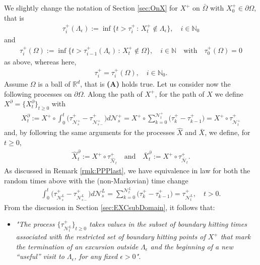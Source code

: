 \documentclass[11pt,a4paper]{article}
\begin{document}
{We slightly change the notation of Section \ref{sec:OnX} for $X^+$ on $\bar{\Omega}$ with $X^+_0 \in \partial \Omega$, that is
\begin{align*}
\tau_i^+(\Lambda_\epsilon) := \inf\{t > \tau_{i}^+\, :\, X^+_t \notin  \Lambda_\epsilon \}, \quad i \in \mathbb{N}_0
\end{align*} 
and 
\begin{align*}
\tau^+_i (\Omega) := \inf\{t > \tau_{i-1}^+(\Lambda_\epsilon)\, :\, X^+_t \notin  \Omega \}, \quad i \in \mathbb{N} \quad \textrm{with} \quad \tau^+_0(\Omega)=0
\end{align*}
as above, whereas here,
\begin{align*}
\tau^+_i= \tau^+_i(\Omega), \quad i \in \mathbb{N}_0.
\end{align*}
Assume $\Omega$ is a ball of $\mathbb{R}^d$, that is {\bf (A)} holds true. Let us consider now the following processes on $\partial \Omega$. Along the path of $X^+$, for the path of $X$ we define $X^\partial = \{X^\partial_t\}_{t\geq 0}$ with   
\begin{align*}
X^\partial_t := X^+ \circ \int_0^t \big( \tau^+_{\mathcal{N}^+_s} - \tau^+_{\mathcal{N}^+_{s-}} \big) d\mathcal{N}^+_s = X^+ \circ \sum_{k=0}^{\mathcal{N}^+_t} \big( \tau^+_k - \tau^+_{k-1} \big) = X^+ \circ \tau^+_{\mathcal{N}^+_t}
\end{align*}
and, by following the same arguments for the processes $\hat{X}$ and $\bar{X}$, we define, for $t\geq 0$,
\begin{align*}
\hat{X}^\partial_t := X^+ \circ \tau^+_{\hat{\mathcal{N}}_t} \quad \textrm{and} \quad \bar{X}^\partial_t := X^+ \circ \tau^+_{\bar{\mathcal{N}}_t}.
\end{align*}
As discussed in Remark \ref{rmk:PPPlast}, we have equivalence in law for both the random times above with the (non-Markovian) time change
\begin{align*}
\int_0^t \big( \tau^+_{\mathcal{N}^L_s} - \tau^+_{\mathcal{N}^L_{s-}} \big) d\mathcal{N}^L_s = \sum_{k=0}^{\mathcal{N}^L_t} \big( \tau^+_k - \tau^+_{k-1} \big) = \tau^+_{\mathcal{N}^L_t}, \quad t >0.
\end{align*}
From the discussion in Section \ref{sec:EXCsubDomain}, it follows that:
\begin{itemize}
\item[] \begin{minipage}{0.85\textwidth}
{\it "The process $\{\tau^+_{\mathcal{N}^L_t}\}_{t\geq 0}$ takes values in the subset of boundary hitting times associated with the restricted set of boundary hitting points of $X^+$ that mark the termination of an excursion outside $\Lambda_\epsilon$ and the beginning of a new ``useful'' visit to $\Lambda_\epsilon$, for any fixed $\epsilon>0$".}

\end{minipage}
\end{itemize}}
\end{document}
